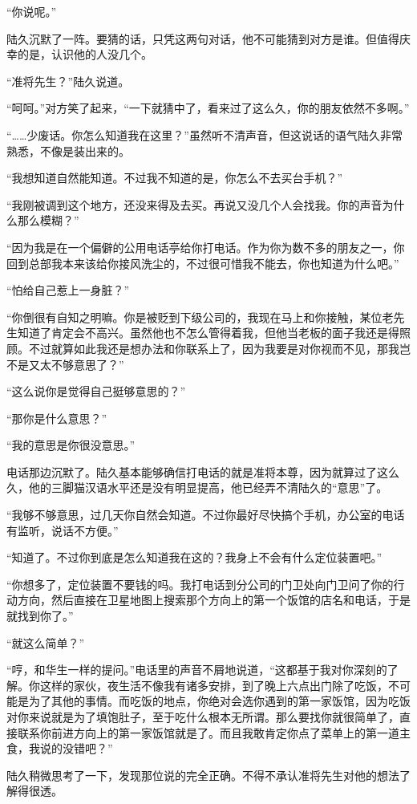 “你说呢。”

陆久沉默了一阵。要猜的话，只凭这两句对话，他不可能猜到对方是谁。但值得庆幸的是，认识他的人没几个。

“准将先生？”陆久说道。

“呵呵。”对方笑了起来，“一下就猜中了，看来过了这么久，你的朋友依然不多啊。”

“……少废话。你怎么知道我在这里？”虽然听不清声音，但这说话的语气陆久非常熟悉，不像是装出来的。

“我想知道自然能知道。不过我不知道的是，你怎么不去买台手机？”

“我刚被调到这个地方，还没来得及去买。再说又没几个人会找我。你的声音为什么那么模糊？”

“因为我是在一个偏僻的公用电话亭给你打电话。作为你为数不多的朋友之一，你回到总部我本来该给你接风洗尘的，不过很可惜我不能去，你也知道为什么吧。”

“怕给自己惹上一身脏？”

“你倒很有自知之明嘛。你是被贬到下级公司的，我现在马上和你接触，某位老先生知道了肯定会不高兴。虽然他也不怎么管得着我，但他当老板的面子我还是得照顾。不过就算如此我还是想办法和你联系上了，因为我要是对你视而不见，那我岂不是又太不够意思了？”

“这么说你是觉得自己挺够意思的？”

“那你是什么意思？”

“我的意思是你很没意思。”

电话那边沉默了。陆久基本能够确信打电话的就是准将本尊，因为就算过了这么久，他的三脚猫汉语水平还是没有明显提高，他已经弄不清陆久的“意思”了。

“我够不够意思，过几天你自然会知道。不过你最好尽快搞个手机，办公室的电话有监听，说话不方便。”

“知道了。不过你到底是怎么知道我在这的？我身上不会有什么定位装置吧。”

“你想多了，定位装置不要钱的吗。我打电话到分公司的门卫处向门卫问了你的行动方向，然后直接在卫星地图上搜索那个方向上的第一个饭馆的店名和电话，于是就找到你了。”

“就这么简单？”

“哼，和华生一样的提问。”电话里的声音不屑地说道，“这都基于我对你深刻的了解。你这样的家伙，夜生活不像我有诸多安排，到了晚上六点出门除了吃饭，不可能是为了其他的事情。而吃饭的地点，你绝对会选你遇到的第一家饭馆，因为吃饭对你来说就是为了填饱肚子，至于吃什么根本无所谓。那么要找你就很简单了，直接联系你前进方向上的第一家饭馆就是了。而且我敢肯定你点了菜单上的第一道主食，我说的没错吧？”

陆久稍微思考了一下，发现那位说的完全正确。不得不承认准将先生对他的想法了解得很透。

